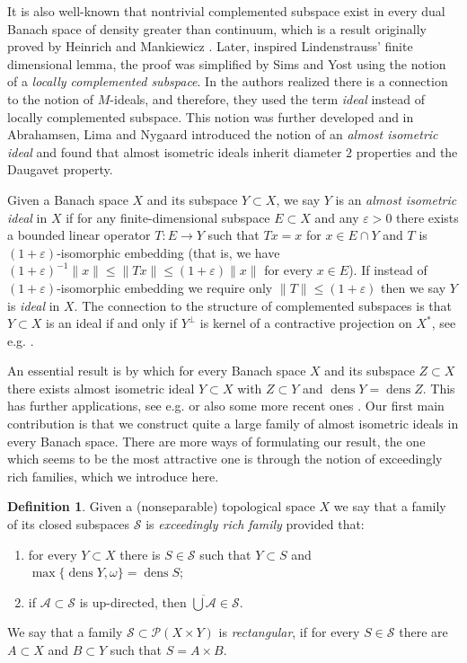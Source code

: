 \documentclass[11pt]{amsart}
\theoremstyle{definition}
\newtheorem{defin}[thm]{Definition}
\theoremstyle{remark}
\newcommand{\A}{\mathcal A}
\newcommand{\PP}{\mathcal P}
\newcommand{\SSS}{\mathcal S}
\def \dens {\operatorname{dens}}
\begin{document}
It is also well-known that nontrivial complemented subspace exist in every dual Banach space of density greater than continuum, which is a result originally proved by Heinrich and Mankiewicz \cite[Corollary 3.8]{HM82}. Later, inspired Lindenstrauss' finite dimensional lemma, the proof was simplified by Sims and Yost \cite{Sims89} using the notion of a \emph{locally complemented subspace}. In \cite{God93} the authors realized there is a connection to the notion of $M$-ideals, and therefore, they used the term \emph{ideal} instead of locally complemented subspace. This notion was further developed and in \cite{Abr14} Abrahamsen, Lima and Nygaard introduced the notion of an \emph{almost isometric ideal} and found that almost isometric ideals inherit diameter $2$ properties and the Daugavet property.

Given a Banach space $X$ and its subspace $Y\subset X$, we say $Y$ is an \emph{almost isometric ideal} in $X$ if for any finite-dimensional subspace $E\subset X$ and any $\varepsilon>0$ there exists a bounded linear operator $T:E\to Y$ such
that $Tx=x$ for $x\in E\cap Y$ and $T$ is $(1+\varepsilon)$-isomorphic embedding (that is, we have $(1+\varepsilon)^{-1}\|x\|\leq \|Tx\|\leq(1+\varepsilon)\|x\|$ for every $x\in E$). If instead of $(1+\varepsilon)$-isomorphic embedding we require only $\|T\|\leq (1+\varepsilon)$ then we say $Y$ is \emph{ideal} in $X$. The connection to the structure of complemented subspaces is that $Y\subset X$ is an ideal if and only if $Y^\perp$ is kernel of a contractive projection on $X^*$, see e.g. \cite[Introduction]{God93}.

An essential result is \cite[Theorem 1.5]{Abr15} by which for every Banach space $X$ and its subspace $Z\subset X$ there exists almost isometric ideal $Y\subset X$ with $Z\subset Y$ and $\dens Y = \dens Z$. This has further applications, see e.g. \cite[Section 3]{Abr15} or also some more recent ones \cite{Band, Zoca21, Zoca22}. Our first main contribution is that we construct quite a large family of almost isometric ideals in every Banach space. There are more ways of formulating our result, the one which seems to be the most attractive one is through the notion of exceedingly rich families, which we introduce here.

\begin{defin}
Given a (nonseparable) topological space $X$ we say that a family of its closed subspaces $\SSS$ is \emph{exceedingly rich family} provided that:
\begin{enumerate}[label=\textnormal{(R-\alph*)}]
    \item\label{it:cofinalFirst} for every $Y\subset X$ there is $S\in\SSS$ such that $Y\subset S$ and $\max\{\dens Y,\omega\} = \dens S$;
    \item\label{it:upDirectedRich} if $\A\subset \SSS$ is up-directed, then $\overline{\bigcup \A} \in \SSS$.
\end{enumerate}
\noindent We say that a family $\SSS\subset \PP(X\times Y)$ is \emph{rectangular}, if for every $S\in\SSS$ there are $A\subset X$ and $B\subset Y$ such that $S = A\times B$.
\end{defin}
\end{document}
